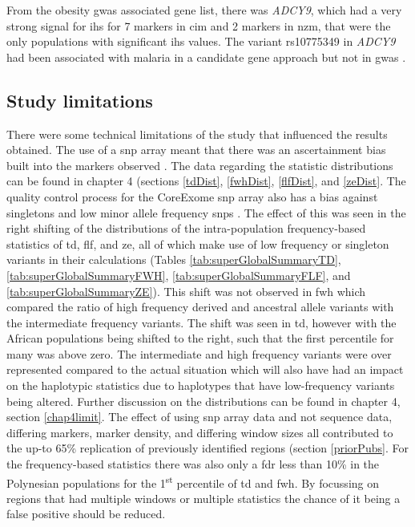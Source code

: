 \documentclass[]{report}
\begin{document}
From the obesity \gls{gwas} associated gene list, there was
\emph{ADCY9}, which had a very strong signal for \gls{ihs} for 7 markers
in \gls{cim} and 2 markers in \gls{nzm}, that were the only populations
with significant \gls{ihs} values. The variant rs10775349 in
\emph{ADCY9} had been associated with malaria in a candidate gene
approach but not in \gls{gwas} \citep{Maiga2013}.

\subsection{Study limitations}\label{chap3limit}

There were some technical limitations of the study that influenced the
results obtained. The use of a \gls{snp} array meant that there was an
ascertainment bias built into the markers observed
\citep{nielsen2007recent}. The data regarding the statistic
distributions can be found in chapter 4 (sections \ref{tdDist},
\ref{fwhDist}, \ref{flfDist}, and \ref{zeDist}. The quality control
process for the CoreExome \gls{snp} array also has a bias against
singletons and low minor allele frequency \glspl{snp} \citep{Guo2014}.
The effect of this was seen in the right shifting of the distributions
of the intra-population frequency-based statistics of \gls{td},
\gls{flf}, and \gls{ze}, all of which make use of low frequency or
singleton variants in their calculations (Tables
\ref{tab:superGlobalSummaryTD}, \ref{tab:superGlobalSummaryFWH},
\ref{tab:superGlobalSummaryFLF}, and \ref{tab:superGlobalSummaryZE}).
This shift was not observed in \gls{fwh} which compared the ratio of
high frequency derived and ancestral allele variants with the
intermediate frequency variants. The shift was seen in \gls{td}, however
with the African populations being shifted to the right, such that the
first percentile for many was above zero. The intermediate and high
frequency variants were over represented compared to the actual
situation which will also have had an impact on the haplotypic
statistics due to haplotypes that have low-frequency variants being
altered. Further discussion on the distributions can be found in chapter
4, section \ref{chap4limit}. The effect of using \gls{snp} array data
and not sequence data, differing markers, marker density, and differing
window sizes all contributed to the up-to 65\% replication of previously
identified regions (section \ref{priorPubs}. For the frequency-based
statistics there was also only a \gls{fdr} less than 10\% in the
Polynesian populations for the 1\textsuperscript{st} percentile of
\gls{td} and \gls{fwh}. By focussing on regions that had multiple
windows or multiple statistics the chance of it being a false positive
should be reduced.
\end{document}
